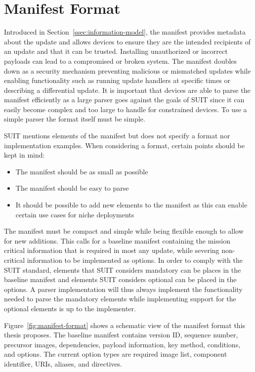 \documentclass[0-thesis.tex]{subfiles}
\begin{document}
\section{Manifest Format}
\label{sec:manifest-format}
Introduced in Section~\ref{ssec:information-model}, the manifest provides metadata about
the update and allows devices to ensure they are the intended recipients of an update and
that it can be trusted. Installing unauthorized or incorrect payloads can lead to a
compromised or broken system. The manifest doubles down as a security mechanism preventing
malicious or mismatched updates while enabling functionality such as running update
handlers at specific times or describing a differential update. It is important that
devices are able to parse the manifest efficiently as a large parser goes against the
goals of SUIT since it can easily become complex and too large to handle for constrained
devices. To use a simple parser the format itself must be simple.

SUIT mentions elements of the manifest but does not specify a format nor implementation
examples. When considering a format, certain points should be kept in mind:

\begin{itemize}
        \item The manifest should be as small as possible
        \item The manifest should be easy to parse
        \item It should be possible to add new elements to the manifest as this can enable
                certain use cases for niche deployments
\end{itemize}

The manifest must be compact and simple while being flexible enough to allow for new
additions. This calls for a baseline manifest containing the mission critical information
that is required in most any update, while severing non-critical information to be
implemented as options. In order to comply with the SUIT standard, elements that SUIT
considers mandatory can be places in the baseline manifest and elements SUIT considers
optional can be placed in the options. A parser implementation will thus always implement
the functionality needed to parse the mandatory elements while implementing support for
the optional elements is up to the implementer.

Figure~\ref{fig:manifest-format} shows a schematic view of the manifest format this thesis
proposes. The baseline manifest contains version ID, sequence number, precursor images,
dependencies, payload information, key method, conditions, and options. The current option
types are required image list, component identifier, URIs, aliases, and directives.
\end{document}
